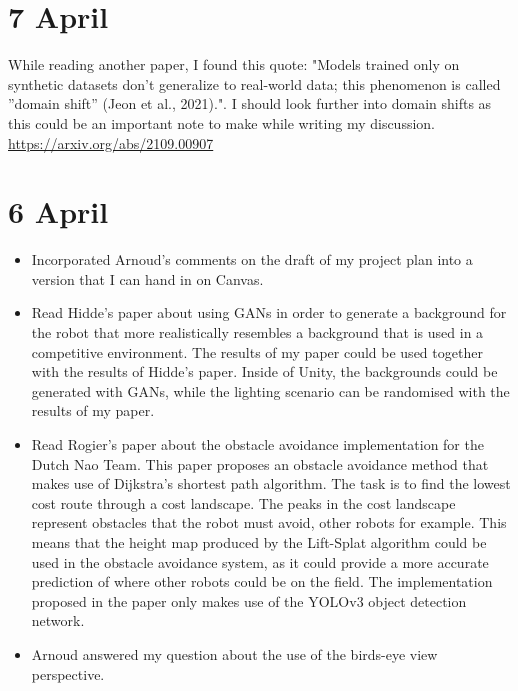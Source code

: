 \documentclass[twoside]{report}
\begin{document}
\section*{7 April}
While reading another paper, I found this quote: "Models trained only on synthetic datasets don’t generalize to real-world data; this phenomenon is called ”domain shift” (Jeon et al., 2021).". I should look further into domain shifts as this could be an important note to make while writing my discussion.
\url{https://arxiv.org/abs/2109.00907}

\section*{6 April}
\begin{itemize}
    \item Incorporated Arnoud's comments on the draft of my project plan into a version that I can hand in on Canvas.
    \item Read Hidde's paper about using GANs in order to generate a background for the robot that more realistically resembles a background that is used in a competitive environment. The results of my paper could be used together with the results of Hidde's paper. Inside of Unity, the backgrounds could be generated with GANs, while the lighting scenario can be randomised with the results of my paper. 
    \item Read Rogier's paper about the obstacle avoidance implementation for the Dutch Nao Team. This paper proposes an obstacle avoidance method that makes use of Dijkstra's shortest path algorithm. The task is to find the lowest cost route through a cost landscape. The peaks in the cost landscape represent obstacles that the robot must avoid, other robots for example. This means that the height map produced by the Lift-Splat algorithm could be used in the obstacle avoidance system, as it could provide a more accurate prediction of where other robots could be on the field. The implementation proposed in the paper only makes use of the YOLOv3 object detection network. 
    \item Arnoud answered my question about the use of the birds-eye view perspective.

\end{itemize}
\end{document}
